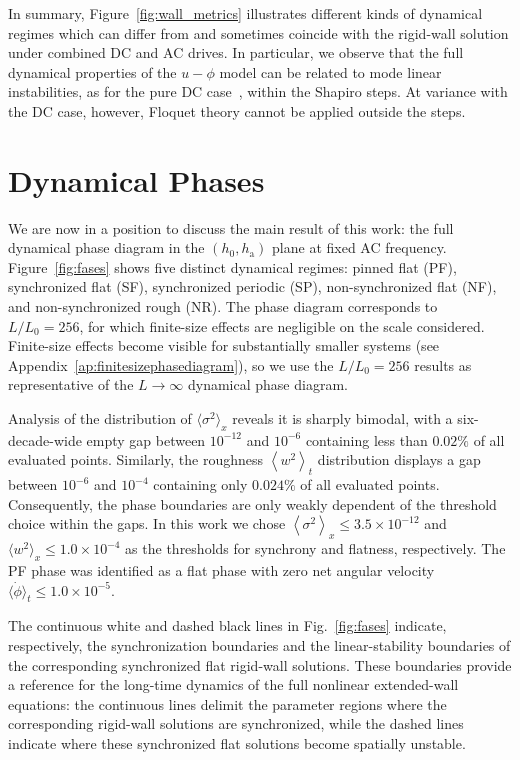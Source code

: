 \documentclass[prb,aps,twocolumn,superscriptaddress,floatfix]{revtex4-2}
\begin{document}
In summary, Figure~\ref{fig:wall_metrics} illustrates different kinds of dynamical regimes which can differ from and sometimes coincide with the rigid-wall solution under combined DC and AC drives. In particular, we observe that the full dynamical properties of the $u-\phi$ model can be related to mode linear instabilities, as for the pure DC case~\cite{pusiol2026deterministic}, within the Shapiro steps. At variance with the DC case, however, Floquet theory cannot be applied outside the steps.

\section{Dynamical Phases}
\label{sec:dynamical_phases}

We are now in a position to discuss the main result of this work: the full dynamical phase diagram in the $(h_0,h_\text{a})$ plane at fixed AC frequency. Figure~\ref{fig:fases} shows five distinct dynamical regimes: pinned flat (PF), synchronized flat (SF), synchronized periodic (SP), non-synchronized flat (NF), and non-synchronized rough (NR). The phase diagram corresponds to $L/L_0=256$, for which finite-size effects are negligible on the scale considered. Finite-size effects become visible for substantially smaller systems (see Appendix~\ref{ap:finitesizephasediagram}), so we use the $L/L_0=256$ results as representative of the $L\to\infty$ dynamical phase diagram. 

Analysis of the distribution of $\langle\sigma^2\rangle_x$ reveals it is sharply bimodal, with a six-decade-wide empty gap between $10 ^{-12}$ and $10^{-6}$ containing less than $0.02\%$ of all evaluated points. Similarly, the roughness $\left\langle w^2\right\rangle_t$ distribution displays a gap between $10^{-6}$ and $10^{-4}$ containing only $0.024\%$ of all evaluated points. Consequently, the phase boundaries are only weakly dependent of the threshold choice within the gaps. In this work we chose $\left\langle\sigma^2\right\rangle_x\leq3.5\times10^{-12}$ and $\langle w^2\rangle_x\leq1.0\times10^{-4}$ as the thresholds for synchrony and flatness, respectively. The PF phase was identified as a flat phase with zero net angular velocity $\langle\dot\phi\rangle_t\leq1.0\times10^{-5}$.

The continuous white and dashed black lines in Fig.~\ref{fig:fases} indicate, respectively, the synchronization boundaries and the linear-stability boundaries of the corresponding synchronized flat rigid-wall solutions. These boundaries provide a reference for the long-time dynamics of the full nonlinear extended-wall equations: the continuous lines delimit the parameter regions where the corresponding rigid-wall solutions are synchronized, while the dashed lines indicate where these synchronized flat solutions become spatially unstable.
\end{document}
